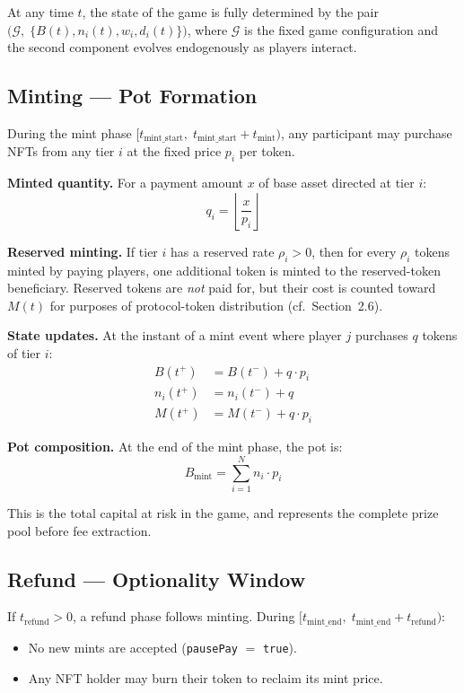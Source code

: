 \documentclass[11pt,a4paper]{article}
\begin{document}
At any time $t$, the state of the game is fully determined by the pair
$\bigl(\mathcal{G}, \; \{B(t), n_i(t), w_i, d_i(t)\}\bigr)$,
where $\mathcal{G}$ is the fixed game configuration and the second component evolves endogenously as players interact.

\subsection{Minting --- Pot Formation}

During the mint phase $[t_{\text{mint\_start}},\; t_{\text{mint\_start}} + t_{\text{mint}})$, any participant may purchase NFTs from any tier $i$ at the fixed price $p_i$ per token.

\textbf{Minted quantity.} For a payment amount $x$ of base asset directed at tier $i$:
\begin{equation}
q_i = \left\lfloor \frac{x}{p_i} \right\rfloor
\end{equation}

\textbf{Reserved minting.} If tier $i$ has a reserved rate $\rho_i > 0$, then for every $\rho_i$ tokens minted by paying players, one additional token is minted to the reserved-token beneficiary. Reserved tokens are \emph{not} paid for, but their cost is counted toward $M(t)$ for purposes of protocol-token distribution (cf.\ Section~2.6).

\textbf{State updates.} At the instant of a mint event where player $j$ purchases $q$ tokens of tier $i$:
\begin{align}
B(t^+) &= B(t^-) + q \cdot p_i \tag{Treasury balance} \\
n_i(t^+) &= n_i(t^-) + q \tag{Tier supply} \\
M(t^+) &= M(t^-) + q \cdot p_i \tag{Total mint cost}
\end{align}

\textbf{Pot composition.} At the end of the mint phase, the pot is:
\begin{equation}
B_{\text{mint}} = \sum_{i=1}^{N} n_i \cdot p_i
\end{equation}

This is the total capital at risk in the game, and represents the complete prize pool before fee extraction.

\subsection{Refund --- Optionality Window}

If $t_{\text{refund}} > 0$, a refund phase follows minting. During $[t_{\text{mint\_end}},\; t_{\text{mint\_end}} + t_{\text{refund}})$:
\begin{itemize}[nosep]
    \item No new mints are accepted (\texttt{pausePay} $=$ \texttt{true}).
    \item Any NFT holder may burn their token to reclaim its mint price.
\end{itemize}
\end{document}

